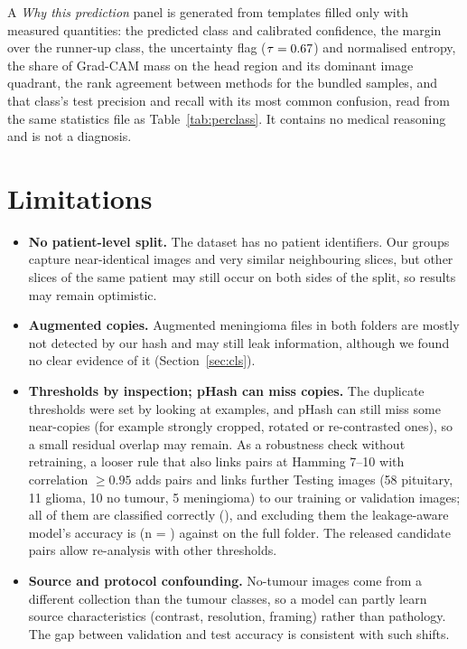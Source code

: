 \documentclass[11pt,a4paper]{article}
\begin{document}
A \emph{Why this prediction} panel is generated from templates filled only with measured quantities: the predicted class and calibrated confidence, the margin over the runner-up class, the uncertainty flag ($\tau=0.67{}$) and normalised entropy, the share of Grad-CAM mass on the head region and its dominant image quadrant, the rank agreement between methods for the bundled samples, and that class's test precision and recall with its most common confusion, read from the same statistics file as Table~\ref{tab:perclass}. It contains no medical reasoning and is not a diagnosis.

\section{Limitations}\label{sec:lim}
\begin{itemize}
\item \textbf{No patient-level split.} The dataset has no patient identifiers. Our groups capture near-identical images and very similar neighbouring slices, but other slices of the same patient may still occur on both sides of the split, so results may remain optimistic.
\item \textbf{Augmented copies.} Augmented meningioma files in both folders are mostly not detected by our hash and may still leak information, although we found no clear evidence of it (Section~\ref{sec:cls}).
\item \textbf{Thresholds by inspection; pHash can miss copies.} The duplicate thresholds were set by looking at examples, and pHash can still miss some near-copies (for example strongly cropped, rotated or re-contrasted ones), so a small residual overlap may remain. As a robustness check without retraining, a looser rule that also links pairs at Hamming 7--10 with correlation $\ge 0.95$ adds \SensExtraPairs{} pairs and links \SensExtraTest{} further Testing images (58 pituitary, 11 glioma, 10 no tumour, 5 meningioma) to our training or validation images; all of them are classified correctly (\SensAccOnExtra{}), and excluding them the leakage-aware model's accuracy is \SensAccExcl{} (n = \SensNExcl{}) against \AccCFull{} on the full folder. The released candidate pairs allow re-analysis with other thresholds.
\item \textbf{Source and protocol confounding.} No-tumour images come from a different collection than the tumour classes, so a model can partly learn source characteristics (contrast, resolution, framing) rather than pathology. The gap between validation and test accuracy is consistent with such shifts.

\end{itemize}
\end{document}
